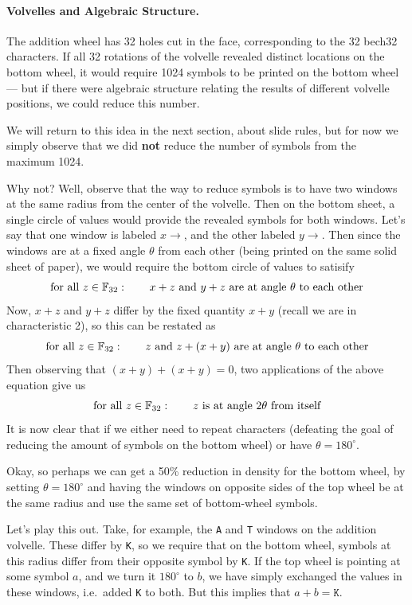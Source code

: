 \documentclass[letterpaper]{article}
\newcommand{\fttwo}{\mathbb{F}_{32}}
\newcommand{\vc}[1]{\texttt{#1}} %
\begin{document}
\paragraph{Volvelles and Algebraic Structure.} The addition wheel has 32 holes cut
in the face, corresponding to the 32 bech32 characters. If all 32 rotations
of the volvelle revealed distinct locations on the bottom wheel, it would
require 1024 symbols to be printed on the bottom wheel --- but if there
were algebraic structure relating the results of different volvelle positions,
we could reduce this number.

We will return to this idea in the next section, about slide rules, but for now
we simply observe that we did \textbf{not} reduce the number of symbols from
the maximum 1024.

Why not? Well, observe that the way to reduce symbols is to have two windows at
the same radius from the center of the volvelle. Then on the bottom sheet, a
single circle of values would provide the revealed symbols for both windows.
Let's say that one window is labeled $x\to$, and the other labeled $y\to$. Then
since the windows are at a fixed angle $\theta$ from each other (being printed
on the same solid sheet of paper), we would require the bottom circle of values
to satisify
\[ \textnormal{for all } z\in\fttwo:\qquad x + z \textnormal{ and } y+z \textnormal{ are at angle $\theta$ to each other} \]
Now, $x+z$ and $y+z$ differ by the fixed quantity $x+y$ (recall we are in
characteristic 2), so this can be restated as
\[ \textnormal{for all } z\in\fttwo:\qquad z \textnormal{ and } z+(x+y) \textnormal{ are at angle $\theta$ to each other} \]
Then observing that $(x+y) + (x+y) = 0$, two applications of the above equation
give us
\[ \textnormal{for all } z\in\fttwo:\qquad z \textnormal{ is at angle $2\theta$ from itself} \]
It is now clear that if we either need to repeat characters (defeating the goal
of reducing the amount of symbols on the bottom wheel) or have $\theta=180^\circ$.

Okay, so perhaps we can get a 50\% reduction in density for the bottom wheel, by
setting $\theta=180^\circ$ and having the windows on opposite sides of the top
wheel be at the same radius and use the same set of bottom-wheel symbols.

Let's play this out. Take, for example, the \vc{A} and \vc{T} windows on the
addition volvelle. These differ by \vc{K}, so we require that on the bottom
wheel, symbols at this radius differ from their opposite symbol by \vc{K}.
If the top wheel is pointing at some symbol $a$, and we turn it $180^\circ$
to $b$, we have simply exchanged the values in these windows, i.e.~added
\vc{K} to both. But this implies that $a+b=\vc{K}$.
\end{document}
